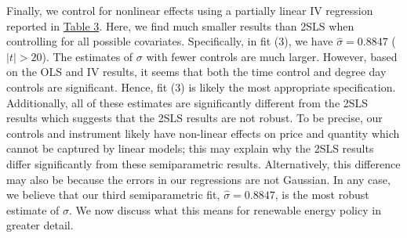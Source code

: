 \documentclass[11pt,a4paper]{extarticle}
\begin{document}
Finally, we control for nonlinear effects using a partially linear IV regression reported in \hyperref[table:3]{Table 3}. Here, we find much smaller results than 2SLS when controlling for all possible covariates. Specifically, in fit (3), we have $\hat{\sigma} = 0.8847$ ($|t| > 20$). The estimates of $\sigma$ with fewer controls are much larger. However, based on the OLS and IV results, it seems that both the time control and degree day controls are significant. Hence, fit (3) is likely the most appropriate specification. Additionally, all of these estimates are significantly different from the 2SLS results which suggests that the 2SLS results are not robust. To be precise, our controls and instrument likely have non-linear effects on price and quantity which cannot be captured by linear models; this may explain why the 2SLS results differ significantly from these semiparametric results. Alternatively, this difference may also be because the errors in our regressions are not Gaussian. In any case, we  believe that our third semiparametric fit, $\hat{\sigma} = 0.8847$, is the most robust estimate of $\sigma$. We now discuss what this means for renewable energy policy in greater detail. 
\end{document}
